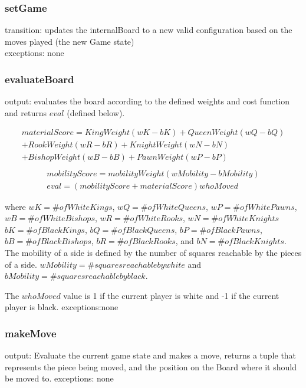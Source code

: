\documentclass{article}
\begin{document}
        \subsubsection*{setGame} 
            transition: updates the internalBoard to a new valid configuration based on the moves played (the new Game state)\\
            exceptions: none
        
        \subsubsection*{evaluateBoard}
            output: evaluates the board according to the defined weights
            and cost function and returns $eval$ (defined below).
            \begin{center}
            \begin{multline*}
                materialScore = KingWeight (wK-bK) + QueenWeight  (wQ-bQ)\\
                           + RookWeight (wR-bR)+ KnightWeight(wN-bN)\\
                           + BishopWeight (wB-bB) + PawnWeight (wP-bP)\\
            \end{multline*}
            \begin{gather*}
              mobilityScore = mobilityWeight (wMobility-bMobility)\\
              eval = (mobilityScore+materialScore)whoMoved
            \end{gather*}
            \end{center}
            where $wK = \# of White Kings$, $wQ = \# of White Queens$,
            $wP = \# of White Pawns$,\\ $wB = \# of White Bishops$, $wR = \# of White Rooks$, $wN = \# of White Knights$\\
            $bK = \# of Black Kings$, $bQ = \# of Black Queens$,
            $bP = \# of Black Pawns$,\\ $bB = \# of Black Bishops$, $bR = \# of Black Rooks$, and $bN = \# of Black Knights$.\\
            
            The mobility of a side is defined by the number of squares reachable by the pieces of a side. $wMobility = \# squares reachable by white$ and $bMobility = \# squares reachable by black$.
            
            The $whoMoved$ value is 1 if the current player is white and -1 if the current player is black.
            exceptions:none
        
        \subsubsection*{makeMove}
        output: Evaluate the current game state and makes a move, returns a tuple that represents the piece being moved, and the position on the Board where it should be moved to.
        exceptions: none
            
\end{document}
